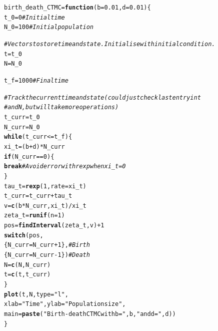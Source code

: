 \documentclass[aspectratio=169]{beamer}\usepackage[]{graphicx}\usepackage[]{xcolor}
\newcommand{\hlnum}[1]{\textcolor[rgb]{0.686,0.059,0.569}{#1}}%
\newcommand{\hlsng}[1]{\textcolor[rgb]{0.192,0.494,0.8}{#1}}%
\newcommand{\hlcom}[1]{\textcolor[rgb]{0.678,0.584,0.686}{\textit{#1}}}%
\newcommand{\hlopt}[1]{\textcolor[rgb]{0,0,0}{#1}}%
\newcommand{\hldef}[1]{\textcolor[rgb]{0.345,0.345,0.345}{#1}}%
\newcommand{\hlkwa}[1]{\textcolor[rgb]{0.161,0.373,0.58}{\textbf{#1}}}%
\newcommand{\hlkwb}[1]{\textcolor[rgb]{0.69,0.353,0.396}{#1}}%
\newcommand{\hlkwc}[1]{\textcolor[rgb]{0.333,0.667,0.333}{#1}}%
\newcommand{\hlkwd}[1]{\textcolor[rgb]{0.737,0.353,0.396}{\textbf{#1}}}%
\newenvironment{knitrout}{}{} %
\begin{document}
\begin{frame}

\begin{knitrout}
\color{fgcolor}
\begin{alltt}
\hldef{birth_death_CTMC} \hlkwb{=} \hlkwa{function}\hldef{(}\hlkwc{b} \hldef{=} \hlnum{0.01}\hldef{,} \hlkwc{d} \hldef{=} \hlnum{0.01}\hldef{) \{}
  \hldef{t_0} \hlkwb{=} \hlnum{0}    \hlcom{# Initial time}
  \hldef{N_0} \hlkwb{=} \hlnum{100}  \hlcom{# Initial population}

  \hlcom{# Vectors to store time and state. Initialise with initial condition.}
  \hldef{t} \hlkwb{=} \hldef{t_0}
  \hldef{N} \hlkwb{=} \hldef{N_0}

  \hldef{t_f} \hlkwb{=} \hlnum{1000}  \hlcom{# Final time}

  \hlcom{# Track the current time and state (could just check last entry in t}
  \hlcom{# and N, but will take more operations)}
  \hldef{t_curr} \hlkwb{=} \hldef{t_0}
  \hldef{N_curr} \hlkwb{=} \hldef{N_0}
  \hlkwa{while} \hldef{(t_curr}\hlopt{<=}\hldef{t_f) \{}
    \hldef{xi_t} \hlkwb{=} \hldef{(b}\hlopt{+}\hldef{d)}\hlopt{*}\hldef{N_curr}
    \hlkwa{if} \hldef{(N_curr} \hlopt{==} \hlnum{0}\hldef{) \{}
      \hlkwa{break} \hlcom{# Avoid error with rexp when xi_t = 0}
    \hldef{\}}
    \hldef{tau_t} \hlkwb{=} \hlkwd{rexp}\hldef{(}\hlnum{1}\hldef{,} \hlkwc{rate} \hldef{= xi_t)}
    \hldef{t_curr} \hlkwb{=} \hldef{t_curr}\hlopt{+}\hldef{tau_t}
    \hldef{v} \hlkwb{=} \hlkwd{c}\hldef{(b}\hlopt{*}\hldef{N_curr, xi_t)}\hlopt{/}\hldef{xi_t}
    \hldef{zeta_t} \hlkwb{=} \hlkwd{runif}\hldef{(}\hlkwc{n} \hldef{=} \hlnum{1}\hldef{)}
    \hldef{pos} \hlkwb{=} \hlkwd{findInterval}\hldef{(zeta_t, v)}\hlopt{+}\hlnum{1}
    \hlkwd{switch}\hldef{(pos,}
           \hldef{\{ N_curr} \hlkwb{=} \hldef{N_curr}\hlopt{+}\hlnum{1}\hldef{\},}  \hlcom{# Birth}
           \hldef{\{ N_curr} \hlkwb{=} \hldef{N_curr}\hlopt{-}\hlnum{1}\hldef{\})} \hlcom{# Death}
    \hldef{N} \hlkwb{=} \hlkwd{c}\hldef{(N, N_curr)}
    \hldef{t} \hlkwb{=} \hlkwd{c}\hldef{(t, t_curr)}
  \hldef{\}}
  \hlkwd{plot}\hldef{(t, N,} \hlkwc{type} \hldef{=} \hlsng{"l"}\hldef{,}
       \hlkwc{xlab} \hldef{=} \hlsng{"Time"}\hldef{,} \hlkwc{ylab} \hldef{=} \hlsng{"Population size"}\hldef{,}
       \hlkwc{main} \hldef{=} \hlkwd{paste}\hldef{(}\hlsng{"Birth-death CTMC with b ="}\hldef{, b,} \hlsng{"and d ="}\hldef{, d))}
\hldef{\}}
\end{alltt}

\end{knitrout}

\end{frame}
\end{document}
